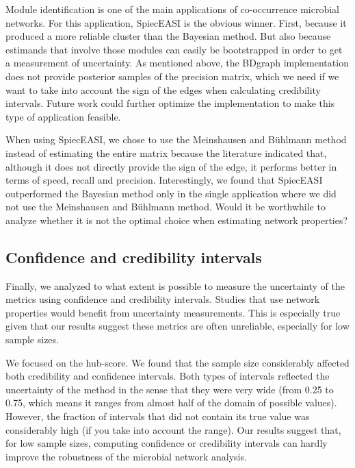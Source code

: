 \documentclass[
  a4paper,
]{article}
\begin{document}
Module identification is one of the main applications of co-occurrence
microbial networks. For this application, SpiecEASI is the obvious
winner. First, because it produced a more reliable cluster than the
Bayesian method. But also because estimands that involve those modules
can easily be bootstrapped in order to get a measurement of uncertainty.
As mentioned above, the BDgraph implementation does not provide
posterior samples of the precision matrix, which we need if we want to
take into account the sign of the edges when calculating credibility
intervals. Future work could further optimize the implementation to make
this type of application feasible.

When using SpiecEASI, we chose to use the Meinshausen and Bühlmann
method instead of estimating the entire matrix because the literature
indicated that, although it does not directly provide the sign of the
edge, it performs better in terms of speed, recall and precision.
Interestingly, we found that SpiecEASI outperformed the Bayesian method
only in the single application where we did not use the Meinshausen and
Bühlmann method. Would it be worthwhile to analyze whether it is not the
optimal choice when estimating network properties?

\hypertarget{confidence-and-credibility-intervals-1}{%
\subsection{Confidence and credibility
intervals}\label{confidence-and-credibility-intervals-1}}

Finally, we analyzed to what extent is possible to measure the
uncertainty of the metrics using confidence and credibility intervals.
Studies that use network properties would benefit from uncertainty
measurements. This is especially true given that our results suggest
these metrics are often unreliable, especially for low sample sizes.

We focused on the hub-score. We found that the sample size considerably
affected both credibility and confidence intervals. Both types of
intervals reflected the uncertainty of the method in the sense that they
were very wide (from 0.25 to 0.75, which means it ranges from almost
half of the domain of possible values). However, the fraction of
intervals that did not contain its true value was considerably high (if
you take into account the range). Our results suggest that, for low
sample sizes, computing confidence or credibility intervals can hardly
improve the robustness of the microbial network analysis.
\end{document}
